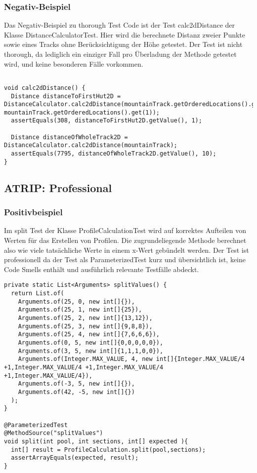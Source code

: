 \subsubsection{Negativ-Beispiel}

Das Negativ-Beispiel zu thorough Test Code ist der Test calc2dDistance der Klasse DistanceCalculatorTest. Hier wird die berechnete Distanz zweier Punkte sowie eines Tracks ohne Berücksichtigung der Höhe getestet. 
Der Test ist nicht thorough, da lediglich ein einziger Fall pro Überladung der Methode getestet wird, und keine besonderen Fälle vorkommen.

\begin{lstlisting}

void calc2dDistance() {
  Distance distanceToFirstHut2D = DistanceCalculator.calc2dDistance(mountainTrack.getOrderedLocations().get(0), mountainTrack.getOrderedLocations().get(1));
  assertEquals(308, distanceToFirstHut2D.getValue(), 1);

  Distance distanceOfWholeTrack2D = DistanceCalculator.calc2dDistance(mountainTrack);
  assertEquals(7795, distanceOfWholeTrack2D.getValue(), 10);
}

\end{lstlisting}

\subsection{ATRIP: Professional}

\subsubsection{Positivbeispiel}

 Im split Test der Klasse ProfileCalculationTest wird auf korrektes Aufteilen von Werten für das Erstellen von Profilen. Die zugrundeliegende Methode berechnet also wie viele tatsächliche Werte in einem x-Wert gebündelt werden.
Der Test ist professionell da der Test als ParameterizedTest kurz und übersichtlich ist, keine Code Smells enthält und ausführlich relevante Testfälle abdeckt.

\begin{lstlisting}
private static List<Arguments> splitValues() {
  return List.of(
    Arguments.of(25, 0, new int[]{}),
    Arguments.of(25, 1, new int[]{25}),
    Arguments.of(25, 2, new int[]{13,12}),
    Arguments.of(25, 3, new int[]{9,8,8}),
    Arguments.of(25, 4, new int[]{7,6,6,6}),
    Arguments.of(0, 5, new int[]{0,0,0,0,0}),
    Arguments.of(3, 5, new int[]{1,1,1,0,0}),
    Arguments.of(Integer.MAX_VALUE, 4, new int[]{Integer.MAX_VALUE/4 +1,Integer.MAX_VALUE/4 +1,Integer.MAX_VALUE/4 +1,Integer.MAX_VALUE/4}),
    Arguments.of(-3, 5, new int[]{}),
    Arguments.of(42, -5, new int[]{})
  );
}

@ParameterizedTest
@MethodSource("splitValues")
void split(int pool, int sections, int[] expected ){
  int[] result = ProfileCalculation.split(pool,sections);
  assertArrayEquals(expected, result);
}

\end{lstlisting}

